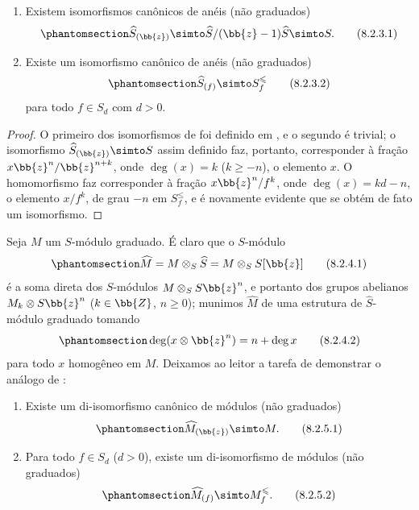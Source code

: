 \documentclass[oneside,10pt]{amsart}
\renewcommand{\leq}{\leqslant}
\renewcommand{\geq}{\geqslant}
\let\EGAOriginalLabel\label
\renewcommand{\label}[1]{\phantomsection\EGAOriginalLabel{#1}}
\begin{document}
\begin{lemma}[8.2.3]
\label{II.8.2.3}
\begin{enumerate}
  \item[\rm{(i)}] Existem isomorfismos canônicos de anéis (não graduados)
    \[
    \label{II.8.2.3.1}
      \widehat{S}_{(\bb{z})}
      \simto
      \widehat{S}/(\bb{z}-1)\widehat{S}
      \simto
      S.
    \tag{8.2.3.1}
    \]
  \item[\rm{(ii)}] Existe um isomorfismo canônico de anéis (não graduados)
    \[
    \label{II.8.2.3.2}
      \widehat{S}_{(f)} \simto S_f^\leq
    \tag{8.2.3.2}
    \]
    para todo $f\in S_d$ com $d>0$.
\end{enumerate}
\end{lemma}

\begin{proof}
O primeiro dos isomorfismos de  foi definido em , e o segundo é trivial;
o isomorfismo $\widehat{S}_{(\bb{z})}\simto S$ assim definido faz, portanto, corresponder à fração $x\bb{z}^n/\bb{z}^{n+k}$, onde $\deg(x)=k$ ($k\geq-n$), o elemento $x$.
O homomorfismo  faz corresponder à fração $x\bb{z}^n/f^k$, onde $\deg(x)=kd-n$, o elemento $x/f^k$, de grau $-n$ em $S_f^\leq$, e é novamente evidente que se obtém de fato um isomorfismo.
\end{proof}

\begin{env}[8.2.4]
\label{II.8.2.4}
Seja $M$ um $S$-módulo graduado.
É claro que o $S$-módulo
\[
\label{II.8.2.4.1}
  \widehat{M}=M\otimes_S\widehat{S}=M\otimes_SS[\bb{z}]
\tag{8.2.4.1}
\]
é a soma direta dos $S$-módulos $M\otimes_SS\bb{z}^n$, e portanto dos grupos abelianos $M_k\otimes S\bb{z}^n$ ($k\in\bb{Z}$, $n\geq0$);
munimos $\widehat{M}$ de uma estrutura de $\widehat{S}$-módulo graduado tomando
\[
\label{II.8.2.4.2}
  \deg(x\otimes\bb{z}^n)=n+\deg x
\tag{8.2.4.2}
\]
para todo $x$ homogêneo em $M$.
Deixamos ao leitor a tarefa de demonstrar o análogo de :
\end{env}

\begin{lemma}[8.2.5]
\label{II.8.2.5}
\begin{enumerate}
  \item[\rm{(i)}] Existe um di-isomorfismo canônico de módulos (não graduados)
    \[
    \label{II.8.2.5.1}
      \widehat{M}_{(\bb{z})} \simto M.
    \tag{8.2.5.1}
    \]
  \item[\rm{(ii)}] Para todo $f\in S_d$ ($d>0$), existe um di-isomorfismo de módulos (não graduados)
    \[
    \label{II.8.2.5.2}
      \widehat{M}_{(f)} \simto M_f^\leq.
    \tag{8.2.5.2}
    \]
\end{enumerate}
\end{lemma}
\end{document}
